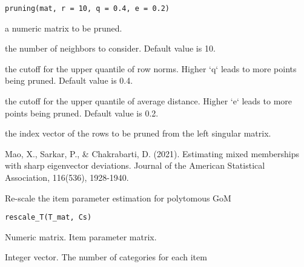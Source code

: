 \documentclass[a4paper]{book}
\begin{document}
%
\begin{Usage}
\begin{verbatim}
pruning(mat, r = 10, q = 0.4, e = 0.2)
\end{verbatim}
\end{Usage}
%
\begin{Arguments}
\begin{ldescription}
\item[\code{mat}] a numeric matrix to be pruned.

\item[\code{r}] the number of neighbors to consider. Default value is 10.

\item[\code{q}] the cutoff for the upper quantile of row norms. Higher `q` leads to more points being pruned. Default value is 0.4.

\item[\code{e}] the cutoff for the upper quantile of average distance. Higher `e` leads to more points being pruned. Default value is 0.2.
\end{ldescription}
\end{Arguments}
%
\begin{Value}
\begin{description}

\item[    the index vector of the rows to be pruned from the left singular matrix.] 
\end{description}

\end{Value}
%
\begin{References}
Mao, X., Sarkar, P., \& Chakrabarti, D. (2021). Estimating mixed memberships with sharp eigenvector deviations. Journal of the American Statistical Association, 116(536), 1928-1940.
\end{References}
%
\begin{Description}
Re-scale the item parameter estimation  for polytomous GoM
\end{Description}
%
\begin{Usage}
\begin{verbatim}
rescale_T(T_mat, Cs)
\end{verbatim}
\end{Usage}
%
\begin{Arguments}
\begin{ldescription}
\item[\code{T\_mat}] Numeric matrix. Item parameter matrix.

\item[\code{Cs}] Integer vector. The number of categories for each item
\end{ldescription}
\end{Arguments}
\end{document}
